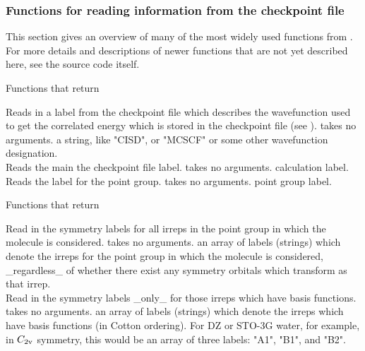 \subsubsection{Functions for reading information from the checkpoint file}
This section gives an overview of many of the most widely used
functions from .  For more details and
descriptions of newer functions that are not yet described here, see
the source code itself.

\begin{center}
Functions that return 
\end{center}
{Reads in a label from the checkpoint file which describes the
wavefunction used to get the correlated energy which is stored in
the checkpoint file (see ).}
{takes no arguments.}
{a string, like "CISD", or "MCSCF" or
some other wavefunction designation.}\\
{Reads the main the checkpoint file label.}
{takes no arguments.}
{calculation label.} \\
{Reads the label for the point group.}
{takes no arguments.}
{point group label.}

\begin{center}
Functions that return 
\end{center}
{Read in the symmetry labels for all irreps in the
point group in which the molecule is considered.}
{takes no arguments.}
{an array of labels (strings) which denote
the irreps for the point group  in which the molecule is considered,
\_regardless\_ of whether there exist any symmetry orbitals which
transform as that irrep.} \\
{Read in the symmetry labels \_only\_ for those irreps
which have basis functions.}
{takes no arguments.}
{an array of labels (strings) which denote
the irreps which have basis functions (in Cotton ordering).  For DZ or
STO-3G water, for example, in $C_{\rm 2v}$ symmetry, this would be an array of
three labels: "A1", "B1", and "B2".}

